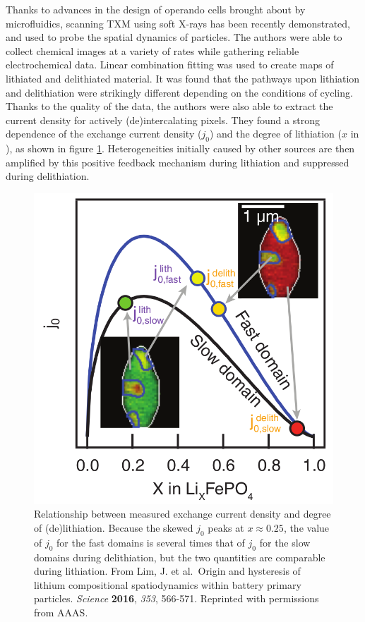 \documentclass[journal=cmatex,manuscript=perspective]{achemso}
\providecommand{\DIFaddend}{} %
\begin{document}
\DIFaddend Thanks to advances in the design of operando cells brought about by
microfluidics, scanning TXM using soft X-rays has been recently
demonstrated, and used to probe the spatial dynamics of 
particles\cite{lim2016}. The authors were able to collect chemical
images at a variety of rates while gathering reliable electrochemical
data. Linear combination fitting was used to create maps of lithiated
and delithiated material. It was found that the pathways upon
lithiation and delithiation were strikingly different depending on the
conditions of cycling. Thanks to the quality of the data, the authors
were also able to extract the current density for actively
(de)intercalating pixels. They found a strong dependence of the
exchange current density ($j_0$) and the degree of lithiation ($x$ in
), as shown in figure
\ref{figure:lim2016}. Heterogeneities initially caused by other
sources are then amplified by this positive feedback mechanism during
lithiation and suppressed during delithiation.

\begin{figure}
  \includegraphics[width=\textwidth]{lim2016.png}
  \caption{Relationship between measured exchange current density and
    degree of (de)lithiation. Because the skewed $j_0$ peaks at $x
    \approx 0.25$, the value of $j_0$ for the fast domains is several
    times that of $j_0$ for the slow domains during delithiation, but
    the two quantities are comparable during lithiation. From Lim,
    J. et al.\ Origin and hysteresis of lithium compositional
    spatiodynamics within battery primary particles. \textit{Science}
    \textbf{2016}, \textit{353}, 566-571. Reprinted with permissions
    from AAAS.}
  \label{figure:lim2016}
\end{figure}
\end{document}
